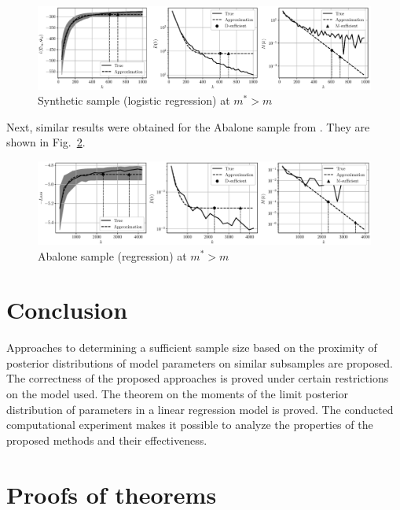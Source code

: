 \documentclass[
11pt,%
tightenlines,%
twoside,%
onecolumn,%
nofloats,%
nobibnotes,%
nofootinbib,%
superscriptaddress,%
noshowpacs,%
centertags]%
{revtex4-2}
\begin{document}
\begin{figure}[h!]
    \centering
    \includegraphics[width=\textwidth]{../paper/figures/gray/eps/synthetic-classification-approximation}
    \caption{Synthetic sample (logistic regression) at $m^*> m$}
    \label{synthetic-classification-approximation}
\end{figure}

Next, similar results were obtained for the Abalone sample from \citep{UCI}. They are shown in Fig.~\ref{abalone-approximation}.

\begin{figure}[h!]
    \centering
    \includegraphics[width=\textwidth]{../paper/figures/gray/eps/abalone-approximation}
    \caption{Abalone sample (regression) at $m^* > m$}
    \label{abalone-approximation}
\end{figure}

\section{Conclusion}

Approaches to determining a sufficient sample size based on the proximity of posterior distributions of model parameters on similar subsamples are proposed. The correctness of the proposed approaches is proved under certain restrictions on the model used. The theorem on the moments of the limit posterior distribution of parameters in a linear regression model is proved. The conducted computational experiment makes it possible to analyze the properties of the proposed methods and their effectiveness.

\appendix

\section{Proofs of theorems}\label{append}
\end{document}
